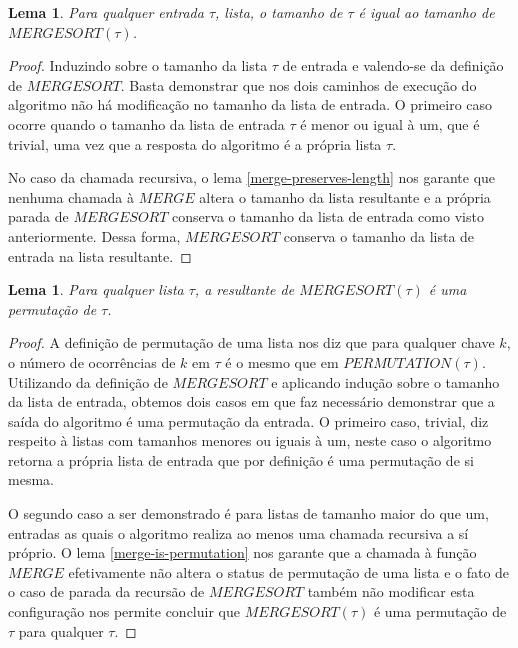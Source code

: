 \documentclass[12pt]{article}
\newtheorem{lemma}[theorem]{Lema}
\theoremstyle{definition}
\begin{document}
\begin{lemma}
\label{mergesort-preserves-length}
        Para qualquer entrada $\tau$, lista, o tamanho de $\tau$ é igual ao tamanho de $MERGESORT(\tau)$.
\end{lemma}

\begin{proof}
        Induzindo sobre o tamanho da lista $\tau$ de entrada e valendo-se da definição de $MERGESORT$. Basta demonstrar
        que nos dois caminhos de execução do algoritmo não há modificação no tamanho da lista de entrada. O primeiro caso
        ocorre quando o tamanho da lista de entrada $\tau$ é menor ou igual à um, que é trivial, uma vez que a resposta do algoritmo
        é a própria lista $\tau$.

        No caso da chamada recursiva, o lema \ref{merge-preserves-length} nos garante que nenhuma chamada à $MERGE$ 
        altera o tamanho da lista resultante e a própria parada de $MERGESORT$ conserva o tamanho da lista de entrada como visto
        anteriormente. Dessa forma, $MERGESORT$ conserva o tamanho da lista de entrada na lista resultante. 
\end{proof}

\begin{lemma}
\label{mergesort-is-permutation}
        Para qualquer lista $\tau$, a resultante de $MERGESORT(\tau)$ é uma permutação de $\tau$.
\end{lemma}

\begin{proof}
        A definição de permutação de uma lista nos diz que para qualquer chave $k$, o número de ocorrências
        de $k$ em $\tau$ é o mesmo que em $PERMUTATION(\tau)$. Utilizando da definição de $MERGESORT$ e aplicando
        indução sobre o tamanho da lista de entrada, obtemos dois casos em que faz necessário demonstrar que
        a saída do algoritmo é uma permutação da entrada. O primeiro caso, trivial, diz respeito à listas com tamanhos menores
        ou iguais à um, neste caso o algoritmo retorna a própria lista de entrada que por definição é uma permutação de si mesma.
        
        O segundo caso a ser demonstrado é para listas de tamanho maior do que um, entradas as quais o algoritmo realiza ao menos
        uma chamada recursiva a sí próprio. O lema \ref{merge-is-permutation} nos garante que a chamada à função $MERGE$
        efetivamente não altera o status de permutação de uma lista e o fato de o caso de parada da recursão de $MERGESORT$ também
        não modificar esta configuração nos permite concluir que $MERGESORT(\tau)$ é uma permutação de $\tau$ para qualquer $\tau$.
\end{proof}
\end{document}
